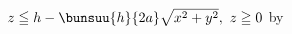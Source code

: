 \documentclass[dvipdfmx,papersize]{jsarticle}
\begin{document}
\hspace{-5.5zw}
$z \leqq h - \bunsuu{h}{2a}\sqrt{x^2+y^2},\ z \geqq 0$ by \ketcindy
\vspace{5mm}

\begin{layerv}[25]{0}{0}
\end{layerv}
\end{document}

